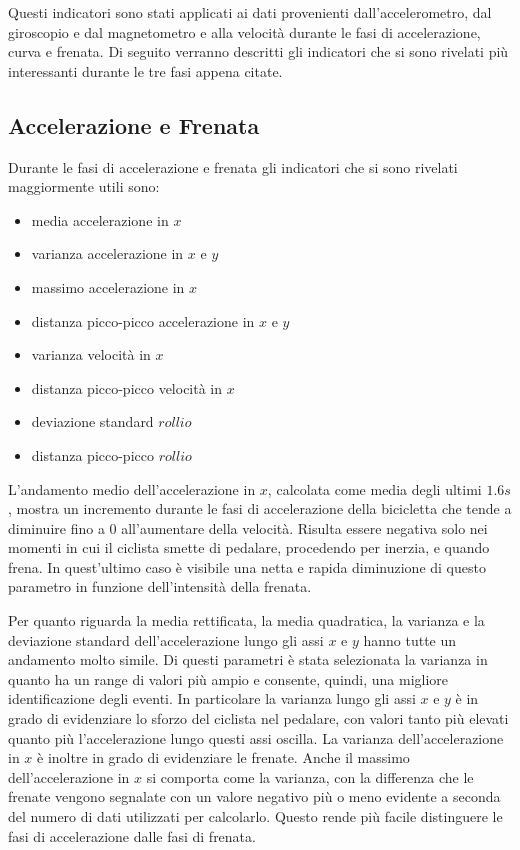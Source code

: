 \documentclass[class=article]{standalone}
\begin{document}
	
	Questi indicatori sono stati applicati ai dati provenienti dall'accelerometro, dal giroscopio e dal magnetometro e alla velocità durante le fasi di accelerazione, curva e frenata. Di seguito verranno descritti gli indicatori che si sono rivelati più interessanti durante le tre fasi appena citate.
	
	\subsection{Accelerazione e Frenata}
	Durante le fasi di accelerazione e frenata gli indicatori che si sono rivelati maggiormente utili sono:
	\begin{itemize}
		\item media accelerazione in \(x\)
		\item varianza accelerazione in \(x\) e \(y\)
		\item massimo accelerazione in \(x\)
		\item distanza picco-picco accelerazione in \(x\) e \(y\)
		\item varianza velocità in \(x\)
		\item distanza picco-picco velocità in \(x\)
		\item deviazione standard \(rollio\)
		\item distanza picco-picco \(rollio\)
	\end{itemize}
	
	L'andamento medio dell'accelerazione in \(x\), calcolata come media degli ultimi \(1.6s\), mostra un incremento durante le fasi di accelerazione della bicicletta che tende a diminuire fino a \(0\) all'aumentare della velocità.
	Risulta essere negativa solo nei momenti in cui il ciclista smette di pedalare, procedendo per inerzia, e quando frena. In quest'ultimo caso è visibile una netta e rapida diminuzione di questo parametro in funzione dell'intensità della frenata.
	
	Per quanto riguarda la media rettificata, la media quadratica, la varianza e la deviazione standard dell'accelerazione lungo gli assi \(x\) e \(y\) hanno tutte un andamento molto simile. Di questi parametri è stata selezionata la varianza in quanto ha un range di valori più ampio e consente, quindi, una migliore identificazione degli eventi. In particolare la varianza lungo gli assi \(x\) e \(y\) è in grado di evidenziare lo sforzo del ciclista nel pedalare, con valori tanto più elevati quanto più l'accelerazione lungo questi assi oscilla. La varianza dell'accelerazione in \(x\) è inoltre in grado di evidenziare le frenate.
	Anche il massimo dell'accelerazione in \(x\) si comporta come la varianza, con la differenza che le frenate vengono segnalate con un valore negativo più o meno evidente a seconda del numero di dati utilizzati per calcolarlo. Questo rende più facile distinguere le fasi di accelerazione dalle fasi di frenata.
	
\end{document}
